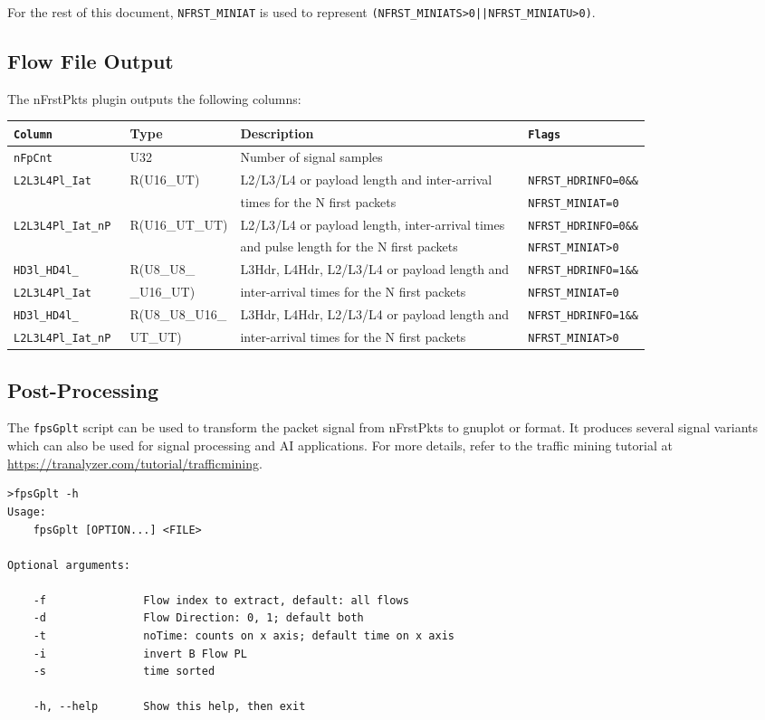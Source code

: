 \documentclass[documentation]{subfiles}
\begin{document}
For the rest of this document, {\tt NFRST\_MINIAT} is used to represent {\tt (NFRST\_MINIATS>0||NFRST\_MINIATU>0)}.

\subsection{Flow File Output}
The nFrstPkts plugin outputs the following columns:
\begin{longtable}{>{\tt}lll>{\tt\small}l}
    \toprule
    {\bf Column} & {\bf Type} & {\bf Description} & {\bf Flags}\\
    \midrule\endhead%
    nFpCnt                   & U32               & Number of signal samples\\
    L2L3L4Pl\_Iat            & R(U16\_UT)        & L2/L3/L4 or payload length and inter-arrival       & NFRST\_HDRINFO=0\&\&\\
                             &                   & \qquad times for the N first packets               & NFRST\_MINIAT=0\\
    L2L3L4Pl\_Iat\_nP        & R(U16\_UT\_UT)    & L2/L3/L4 or payload length, inter-arrival times    & NFRST\_HDRINFO=0\&\&\\
                             &                   & \qquad and pulse length for the N first packets    & NFRST\_MINIAT>0\\
    HD3l\_HD4l\_             & R(U8\_U8\_        & L3Hdr, L4Hdr, L2/L3/L4 or payload length and       & NFRST\_HDRINFO=1\&\&\\
    \qquad L2L3L4Pl\_Iat     & \qquad \_U16\_UT) & \qquad inter-arrival times for the N first packets & NFRST\_MINIAT=0\\
    HD3l\_HD4l\_             & R(U8\_U8\_U16\_   & L3Hdr, L4Hdr, L2/L3/L4 or payload length and       & NFRST\_HDRINFO=1\&\&\\
    \qquad L2L3L4Pl\_Iat\_nP & \qquad UT\_UT)    & \qquad inter-arrival times for the N first packets & NFRST\_MINIAT>0\\
    \bottomrule
\end{longtable}

\subsection{Post-Processing}
The {\tt fpsGplt} script can be used to transform the packet signal from nFrstPkts to gnuplot or  format. It produces several signal variants which can also be used for signal processing and AI applications. For more details, refer to the traffic mining tutorial at \url{https://tranalyzer.com/tutorial/trafficmining}.\\

\begin{verbatim}
>fpsGplt -h
Usage:
    fpsGplt [OPTION...] <FILE>

Optional arguments:

    -f               Flow index to extract, default: all flows
    -d               Flow Direction: 0, 1; default both
    -t               noTime: counts on x axis; default time on x axis
    -i               invert B Flow PL
    -s               time sorted

    -h, --help       Show this help, then exit
\end{verbatim}
\end{document}

